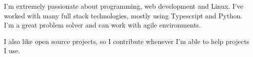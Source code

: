 

\begin{cvparagraph}

I'm extremely passionate about programming, web development
and Linux.
I've worked with many full stack technologies, mostly using
Typescript and Python.
I'm a great problem solver and can work with agile
environments.
\end{cvparagraph}

\begin{cvparagraph}

I also like open source projects, so I contribute whenever I'm able to help projects I use.


\end{cvparagraph}